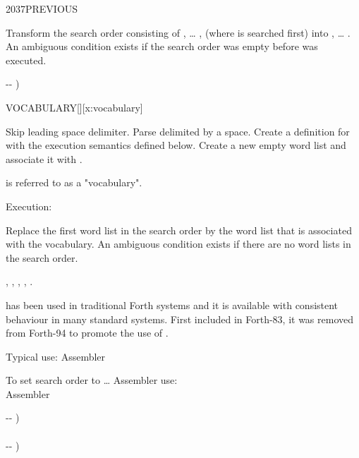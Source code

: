 \begin{worddef}{2037}{PREVIOUS}
\item \stack{}{}

	Transform the search order consisting of , {\ldots}
	,  (where  is searched
	first) into , {\ldots} . An ambiguous
	condition exists if the search order was empty before
	 was executed.

	\begin{implement} %
		\word{:}   -{}- )
			    
		\word{;}
	\end{implement}
\end{worddef}


\begin{worddef*}{}{VOCABULARY}[][x:vocabulary]
\item {}

	Skip leading space delimiter. Parse  delimited by a space.
	Create a definition for  with the execution semantics defined
	below. Create a new empty word list  and associate it with
	.

	 is referred to as a "vocabulary".

\item[\param{name} Execution:]
	\stack{}{}

	Replace the first word list in the search order by the word list 
	that is associated with the  vocabulary. An ambiguous condition
	exists if there are no word lists in the search order.

\see {},
	,
	,
	,
	.

	\begin{rationale}
		 has been used in traditional Forth systems and it is
		available with consistent behaviour in many standard systems. First included
		in Forth-83, it was removed from Forth-94 to promote the use of
		.

	\item[Typical use:]
		 Assembler

		To set search order to {\ldots}  Assembler use: \\
		   Assembler 
	\end{rationale}

	\begin{implement}
		\word{:}   -{}- ) \\
		\tab {}  \word{,} \\
		\tab {}  -{}- ) \\
		\tab[2]      \\
		\tab[2]    \\
		\word{;}
	\end{implement}
\end{worddef*}
